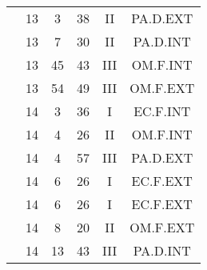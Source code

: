 \documentclass[12pt, a4paper]{article}
\begin{document}
\begin{multicols}{3}
{\begin{tabular}{c c c c c c}
	 	 	 	 & 13 & 3 & 38 & II & PA.D.EXT\\%
	 	 	 	 & 13 & 7 & 30 & II & PA.D.INT\\%
	 	 	 	 & 13 & 45 & 43 & III & OM.F.INT\\%
	 	 	 	 & 13 & 54 & 49 & III & OM.F.EXT\\%
	 	 	 	 & 14 & 3 & 36 & I & EC.F.INT\\%
	 	 	 	 & 14 & 4 & 26 & II & OM.F.INT\\%
	 	 	 	 & 14 & 4 & 57 & III & PA.D.EXT\\%
	 	 	 	 & 14 & 6 & 26 & I & EC.F.EXT\\%
	 	 	 	 & 14 & 6 & 26 & I & EC.F.EXT\\%
	 	 	 	 & 14 & 8 & 20 & II & OM.F.EXT\\%
	 	 	 	 & 14 & 13 & 43 & III & PA.D.INT\\%
	 	 \end{tabular}
 	}
\end{multicols}
\end{document}
